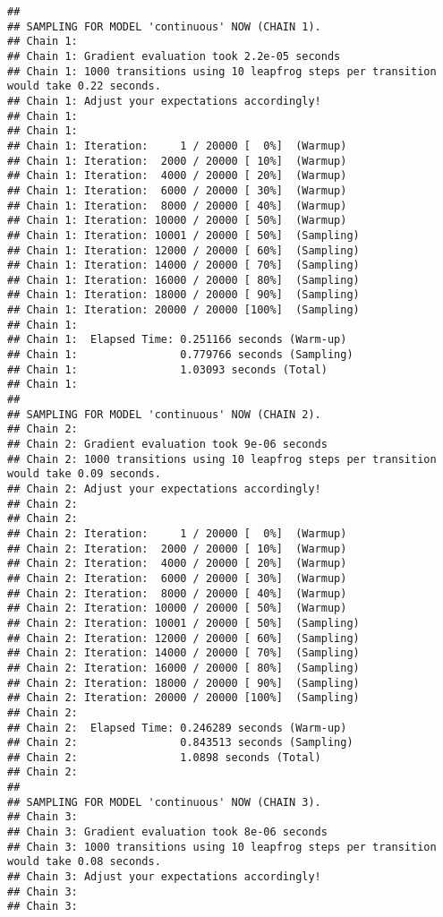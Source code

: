 \documentclass[
]{article}
\begin{document}
\begin{verbatim}
## 
## SAMPLING FOR MODEL 'continuous' NOW (CHAIN 1).
## Chain 1: 
## Chain 1: Gradient evaluation took 2.2e-05 seconds
## Chain 1: 1000 transitions using 10 leapfrog steps per transition would take 0.22 seconds.
## Chain 1: Adjust your expectations accordingly!
## Chain 1: 
## Chain 1: 
## Chain 1: Iteration:     1 / 20000 [  0%]  (Warmup)
## Chain 1: Iteration:  2000 / 20000 [ 10%]  (Warmup)
## Chain 1: Iteration:  4000 / 20000 [ 20%]  (Warmup)
## Chain 1: Iteration:  6000 / 20000 [ 30%]  (Warmup)
## Chain 1: Iteration:  8000 / 20000 [ 40%]  (Warmup)
## Chain 1: Iteration: 10000 / 20000 [ 50%]  (Warmup)
## Chain 1: Iteration: 10001 / 20000 [ 50%]  (Sampling)
## Chain 1: Iteration: 12000 / 20000 [ 60%]  (Sampling)
## Chain 1: Iteration: 14000 / 20000 [ 70%]  (Sampling)
## Chain 1: Iteration: 16000 / 20000 [ 80%]  (Sampling)
## Chain 1: Iteration: 18000 / 20000 [ 90%]  (Sampling)
## Chain 1: Iteration: 20000 / 20000 [100%]  (Sampling)
## Chain 1: 
## Chain 1:  Elapsed Time: 0.251166 seconds (Warm-up)
## Chain 1:                0.779766 seconds (Sampling)
## Chain 1:                1.03093 seconds (Total)
## Chain 1: 
## 
## SAMPLING FOR MODEL 'continuous' NOW (CHAIN 2).
## Chain 2: 
## Chain 2: Gradient evaluation took 9e-06 seconds
## Chain 2: 1000 transitions using 10 leapfrog steps per transition would take 0.09 seconds.
## Chain 2: Adjust your expectations accordingly!
## Chain 2: 
## Chain 2: 
## Chain 2: Iteration:     1 / 20000 [  0%]  (Warmup)
## Chain 2: Iteration:  2000 / 20000 [ 10%]  (Warmup)
## Chain 2: Iteration:  4000 / 20000 [ 20%]  (Warmup)
## Chain 2: Iteration:  6000 / 20000 [ 30%]  (Warmup)
## Chain 2: Iteration:  8000 / 20000 [ 40%]  (Warmup)
## Chain 2: Iteration: 10000 / 20000 [ 50%]  (Warmup)
## Chain 2: Iteration: 10001 / 20000 [ 50%]  (Sampling)
## Chain 2: Iteration: 12000 / 20000 [ 60%]  (Sampling)
## Chain 2: Iteration: 14000 / 20000 [ 70%]  (Sampling)
## Chain 2: Iteration: 16000 / 20000 [ 80%]  (Sampling)
## Chain 2: Iteration: 18000 / 20000 [ 90%]  (Sampling)
## Chain 2: Iteration: 20000 / 20000 [100%]  (Sampling)
## Chain 2: 
## Chain 2:  Elapsed Time: 0.246289 seconds (Warm-up)
## Chain 2:                0.843513 seconds (Sampling)
## Chain 2:                1.0898 seconds (Total)
## Chain 2: 
## 
## SAMPLING FOR MODEL 'continuous' NOW (CHAIN 3).
## Chain 3: 
## Chain 3: Gradient evaluation took 8e-06 seconds
## Chain 3: 1000 transitions using 10 leapfrog steps per transition would take 0.08 seconds.
## Chain 3: Adjust your expectations accordingly!
## Chain 3: 
## Chain 3: 

\end{verbatim}
\end{document}

